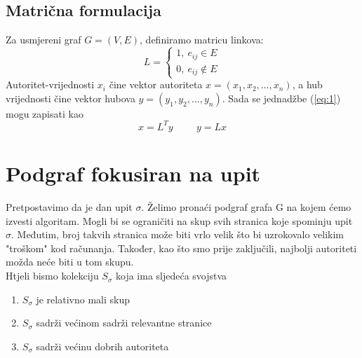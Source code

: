 \documentclass[11pt]{article}
\begin{document}
\subsection{Matrična formulacija}
Za usmjereni graf $G=(V,E)$, definiramo matricu linkova:
$$L = \begin{cases}
1,~e_{ij}\in E\\
0,~e_{ij}\not\in E
\end{cases}$$
Autoritet-vrijednosti $x_{i}$ čine vektor autoriteta $x = (x_{1}, x_{2}, \dots, x_{n})$, a hub vrijednosti čine vektor hubova $y = (y_{1}, y_{2}, \dots, y_{n})$.
Sada se jednadžbe (\ref{eq:1}) mogu zapisati kao
\begin{equation}\label{eq:2}
x = L^{T}y\hspace{1cm}y = Lx
\end{equation}
\newpage

\section{Podgraf fokusiran na upit}
Pretpostavimo da je dan upit $\sigma$. Želimo pronaći podgraf grafa G na kojem ćemo izvesti algoritam. Mogli bi se ograničiti na skup svih stranica koje spominju upit $\sigma$. Međutim, broj takvih stranica može biti vrlo velik što bi uzrokovalo velikim "troškom" kod računanja. Također, kao što smo prije zaključili, najbolji autoriteti možda neće biti u tom skupu.\\
Htjeli bismo kolekciju $S_{\sigma}$ koja ima sljedeća svojstva
\begin{enumerate}
\item $S_{\sigma}$ je relativno mali skup \label{pr:1}
\item $S_{\sigma}$ sadrži većinom sadrži relevantne stranice \label{pr:2}
\item $S_{\sigma}$ sadrži većinu dobrih autoriteta \label{pr:3}
\end{enumerate}
\end{document}
